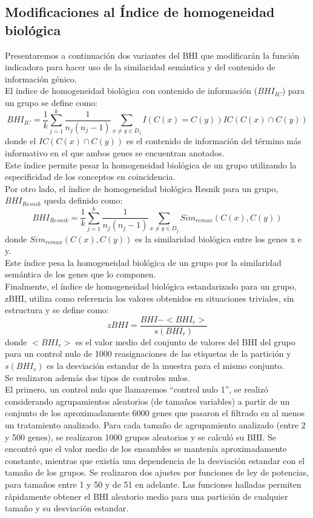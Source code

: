 \subsection{Modificaciones al Índice de homogeneidad biológica}
\label{subsec:control_nulo}
Presentaremos a continuación dos variantes del BHI que modificarán la función indicadora para hacer uso de la similaridad semántica y del contenido de información génico.\\
El índice de homogeneidad biológica con contenido de información ($BHI_{IC}$) para un grupo se define como:
\begin{equation}
	BHI_{IC} = \frac{1}{k}\sum\limits_{j=1}^k\frac{1}{n_j(n_j-1)}\sum\limits_{x\neq y\in D_j}I(C(x)=C(y))IC(C(x)\cap C(y))
\end{equation}
donde el $IC(C(x)\cap C(y))$ es el contenido de información del término más informativo en el que ambos genes se encuentran anotados.\\
Este índice permite pesar la homogeneidad biológica de un grupo utilizando la especificidad de los conceptos en coincidencia.\\
Por otro lado, el índice de homogeneidad biológica Resnik para un grupo, $BHI_{Resnik}$ queda definido como:
\begin{equation}
	BHI_{Resnik} = \frac{1}{k}\sum\limits_{j=1}^k\frac{1}{n_j(n_j-1)}\sum\limits_{x\neq y\in D_j}Sim_{rcmax}(C(x), C(y))
\end{equation}
donde $Sim_{rcmax}(C(x), C(y))$ es la similaridad biológica entre los genes x e y.\\
Este índice pesa la homogeneidad biológica de un grupo por la similaridad semántica de los genes que lo componen.\\
Finalmente, el índice de homogeneidad biológica estandarizado para un grupo, zBHI, utiliza como referencia los valores obtenidos en situaciones triviales, sin estructura y se define como:
\begin{equation}
	zBHI = \frac{BHI-<BHI_r>}{s(BHI_r)}
\end{equation}
donde $<BHI_r>$ es el valor medio del conjunto de valores del BHI del grupo para un control nulo de 1000 reasignaciones de las etiquetas de la partición y $s(BHI_r)$ es la desviación estandar de la muestra para el mismo conjunto.\\
Se realizaron además dos tipos de controles nulos.\\
El primero, un control nulo que llamaremos ``control nulo 1'', se realizó considerando agrupamientos aleatorios (de tamaños variables) a partir de un conjunto de los aproximadamente 6000 genes que pasaron el filtrado en al menos un tratamiento analizado. Para cada tamaño de agrupamiento analizado (entre 2 y 500 genes), se realizaron 1000 grupos aleatorios y se calculó su BHI. Se encontró que el valor medio de los ensambles se mantenía aproximadamente constante, mientras que existía una dependencia de la desviación estandar con el tamaño de los grupos. Se realizaron dos ajustes por funciones de ley de potencias, para tamaños entre 1 y 50 y de 51 en adelante. Las funciones halladas permiten rápidamente obtener el BHI aleatorio medio para una partición de cualquier tamaño y su desviación estandar.\\
